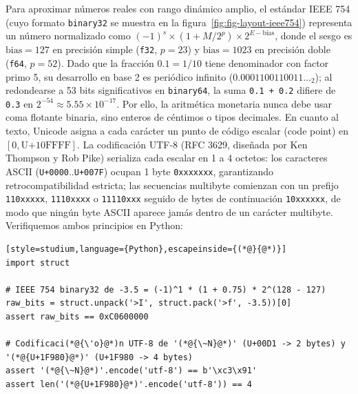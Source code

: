 \documentclass{book}
\begin{document}
Para aproximar números reales con rango dinámico amplio, el estándar IEEE 754 (cuyo formato \texttt{binary32} se muestra en la figura~\ref{fig:fig-layout-ieee754}) representa un número normalizado como \((-1)^s \times (1 + M / 2^{p}) \times 2^{E - \text{bias}}\), donde el sesgo es \(\text{bias} = 127\) en precisión simple (\texttt{f32}, \(p = 23\)) y \(\text{bias} = 1023\) en precisión doble (\texttt{f64}, \(p = 52\)). Dado que la fracción \(0.1 = 1/10\) tiene denominador con factor primo 5, su desarrollo en base 2 es periódico infinito (\(0.0001100110011\ldots_2\)); al redondearse a 53 bits significativos en \texttt{binary64}, la suma \texttt{0.1 + 0.2} difiere de \texttt{0.3} en \(2^{-54} \approx 5.55 \times 10^{-17}\). Por ello, la aritmética monetaria nunca debe usar coma flotante binaria, sino enteros de céntimos o tipos decimales.
En cuanto al texto, Unicode asigna a cada carácter un punto de código escalar (code point) en \([0, \text{U+10FFFF}]\). La codificación UTF-8 (RFC 3629, diseñada por Ken Thompson y Rob Pike) serializa cada escalar en 1 a 4 octetos: los caracteres ASCII (\texttt{U+0000}..\texttt{U+007F}) ocupan 1 byte \texttt{0xxxxxxx}, garantizando retrocompatibilidad estricta; las secuencias multibyte comienzan con un prefijo \texttt{110xxxxx}, \texttt{1110xxxx} o \texttt{11110xxx} seguido de bytes de continuación \texttt{10xxxxxx}, de modo que ningún byte ASCII aparece jamás dentro de un carácter multibyte. Verifiquemos ambos principios en Python:
\begin{lstlisting}[style=studium,language={Python},escapeinside={(*@}{@*)}]
import struct

# IEEE 754 binary32 de -3.5 = (-1)^1 * (1 + 0.75) * 2^(128 - 127)
raw_bits = struct.unpack('>I', struct.pack('>f', -3.5))[0]
assert raw_bits == 0xC0600000

# Codificaci(*@{\'o}@*)n UTF-8 de '(*@{\~N}@*)' (U+00D1 -> 2 bytes) y '(*@{U+1F980}@*)' (U+1F980 -> 4 bytes)
assert '(*@{\~N}@*)'.encode('utf-8') == b'\xc3\x91'
assert len('(*@{U+1F980}@*)'.encode('utf-8')) == 4
\end{lstlisting}
\end{document}
